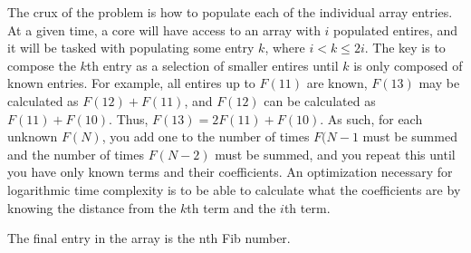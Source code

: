 \documentclass[12pt]{article}
\begin{document}
The crux of the problem is how to populate each of the individual array entries. At a given time, a core will have access to an array with $i$ populated entires, and it will be tasked with populating some entry $k$, where $i < k \leq 2i$. The key is to compose the $k$th entry as a selection of smaller entires until $k$ is only composed of known entries.  For example, all entires up to $F(11)$ are known, $F(13)$ may be calculated as $F(12) + F(11)$, and $F(12)$ can be calculated as $F(11) + F(10)$. Thus, $F(13) =  2F(11) + F(10)$. As such, for each unknown $F(N)$, you add one to the number of times $F(N-1$ must be summed and the number of times $F(N-2)$ must be summed, and you repeat this until you have only known terms and their coefficients. An optimization necessary for logarithmic time complexity is to be able to calculate what the coefficients are by knowing the distance from the $k$th term and the $i$th term. 

The final entry in the array is the nth Fib number.
\end{document}
